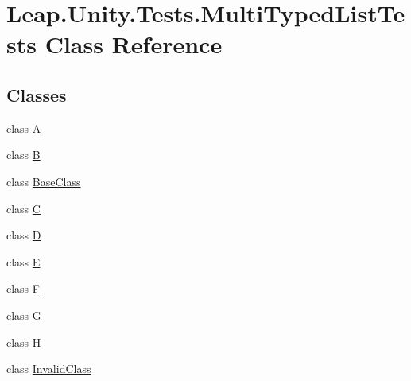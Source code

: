 \hypertarget{class_leap_1_1_unity_1_1_tests_1_1_multi_typed_list_tests}{}\section{Leap.\+Unity.\+Tests.\+Multi\+Typed\+List\+Tests Class Reference}
\label{class_leap_1_1_unity_1_1_tests_1_1_multi_typed_list_tests}
\subsection*{Classes}
\begin{DoxyCompactItemize}
\item 
class \mbox{\hyperlink{class_leap_1_1_unity_1_1_tests_1_1_multi_typed_list_tests_1_1_a}{A}}
\item 
class \mbox{\hyperlink{class_leap_1_1_unity_1_1_tests_1_1_multi_typed_list_tests_1_1_b}{B}}
\item 
class \mbox{\hyperlink{class_leap_1_1_unity_1_1_tests_1_1_multi_typed_list_tests_1_1_base_class}{Base\+Class}}
\item 
class \mbox{\hyperlink{class_leap_1_1_unity_1_1_tests_1_1_multi_typed_list_tests_1_1_c}{C}}
\item 
class \mbox{\hyperlink{class_leap_1_1_unity_1_1_tests_1_1_multi_typed_list_tests_1_1_d}{D}}
\item 
class \mbox{\hyperlink{class_leap_1_1_unity_1_1_tests_1_1_multi_typed_list_tests_1_1_e}{E}}
\item 
class \mbox{\hyperlink{class_leap_1_1_unity_1_1_tests_1_1_multi_typed_list_tests_1_1_f}{F}}
\item 
class \mbox{\hyperlink{class_leap_1_1_unity_1_1_tests_1_1_multi_typed_list_tests_1_1_g}{G}}
\item 
class \mbox{\hyperlink{class_leap_1_1_unity_1_1_tests_1_1_multi_typed_list_tests_1_1_h}{H}}
\item 
class \mbox{\hyperlink{class_leap_1_1_unity_1_1_tests_1_1_multi_typed_list_tests_1_1_invalid_class}{Invalid\+Class}}
\end{DoxyCompactItemize}
